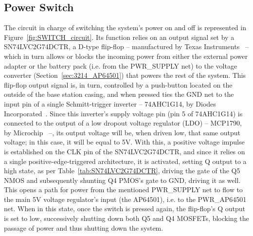 
\subsection{Power Switch}\label{sec:3213_SWITCH}

The circuit in charge of switching the system's power on and off is represented in Figure~\ref{fig:SWITCH_circuit}. Its function relies on an output signal set by a SN74LVC2G74DCTR, a D-type flip-flop -- manufactured by Texas Instruments~\cite{SN74LVC2G74DCTR} -- which in turn allows or blocks the incoming power from either the external power adapter or the battery pack (i.e. from the PWR\_SUPPLY net) to the voltage converter (Section~\ref{sec:3214_AP64501}) that powers the rest of the system.
This flip-flop output signal is, in turn, controlled by a push-button located on the outside of the base station casing, and when pressed ties the GND net to the input pin of a single Schmitt-trigger inverter -- 74AHC1G14, by Diodes Incorporated~\cite{74AHC1G14}.
Since this inverter's supply voltage pin (pin 5 of 74AHC1G14) is connected to the output of a low dropout voltage regulator (LDO) -- MCP1790, by Microchip~\cite{MCP1790} --, its output voltage will be, when driven low, that same output voltage; in this case, it will be equal to 5V.
With this, a positive voltage impulse is established on the CLK pin of the SN74LVC2G74DCTR, and since it relies on a single positive-edge-triggered architecture, it is activated, setting Q output to a high state, as per Table~\ref{tab:SN74LVC2G74DCTR}, driving the gate of the Q5 NMOS and subsequently shunting Q4 PMOS's gate to GND, driving it as well.
This opens a path for power from the mentioned PWR\_SUPPLY net to flow to the main 5V voltage regulator's input (the AP64501), i.e. to the PWR\_AP64501 net. When in this state, once the switch is pressed again, the flip-flop's Q output is set to low, successively shutting down both Q5 and Q4 MOSFETs, blocking the passage of power and thus shutting down the system.

